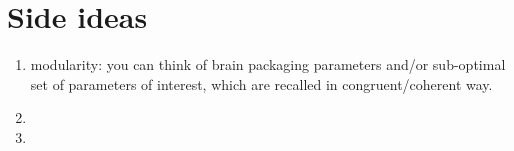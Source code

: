 \documentclass{article}
\begin{document}
\section{Side ideas} 

\begin{enumerate}
\item modularity: you can think of brain packaging parameters and/or sub-optimal set of parameters of interest, which are recalled in congruent/coherent way.
\item 
\item
\end{enumerate}


\end{document}
